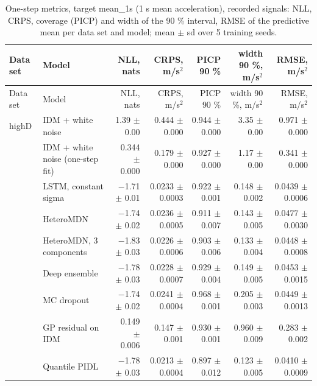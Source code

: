 \begingroup
\footnotesize
\begin{longtable}{llrrrrr}
\caption{One-step metrics, target mean\_1s (1 s mean acceleration), recorded signals: NLL, CRPS, coverage (PICP) and width of the 90 \% interval, RMSE of the predictive mean per data set and model; mean $\pm$ sd over 5 training seeds.}\label{tab:t1-one-step--raw--mean-1s} \\
\toprule
Data set & Model & NLL, nats & CRPS, m/s$^2$ & PICP 90 \% & width 90 \%, m/s$^2$ & RMSE, m/s$^2$ \\
\midrule
\endfirsthead
\toprule
Data set & Model & NLL, nats & CRPS, m/s$^2$ & PICP 90 \% & width 90 \%, m/s$^2$ & RMSE, m/s$^2$ \\
\midrule
\endhead
\bottomrule
\endlastfoot
highD & IDM + white noise & 1.39 $\pm$ 0.00 & 0.444 $\pm$ 0.000 & 0.944 $\pm$ 0.000 & 3.35 $\pm$ 0.00 & 0.971 $\pm$ 0.000 \\
 & IDM + white noise (one-step fit) & 0.344 $\pm$ 0.000 & 0.179 $\pm$ 0.000 & 0.927 $\pm$ 0.000 & 1.17 $\pm$ 0.00 & 0.341 $\pm$ 0.000 \\
 & LSTM, constant sigma & $-$1.71 $\pm$ 0.01 & 0.0233 $\pm$ 0.0003 & 0.922 $\pm$ 0.001 & 0.148 $\pm$ 0.002 & 0.0439 $\pm$ 0.0006 \\
 & HeteroMDN & $-$1.74 $\pm$ 0.02 & 0.0236 $\pm$ 0.0005 & 0.911 $\pm$ 0.007 & 0.143 $\pm$ 0.005 & 0.0477 $\pm$ 0.0030 \\
 & HeteroMDN, 3 components & $-$1.83 $\pm$ 0.03 & 0.0226 $\pm$ 0.0006 & 0.903 $\pm$ 0.006 & 0.133 $\pm$ 0.004 & 0.0448 $\pm$ 0.0008 \\
 & Deep ensemble & $-$1.78 $\pm$ 0.03 & 0.0228 $\pm$ 0.0007 & 0.929 $\pm$ 0.004 & 0.149 $\pm$ 0.005 & 0.0453 $\pm$ 0.0015 \\
 & MC dropout & $-$1.74 $\pm$ 0.02 & 0.0241 $\pm$ 0.0004 & 0.968 $\pm$ 0.001 & 0.205 $\pm$ 0.003 & 0.0449 $\pm$ 0.0013 \\
 & GP residual on IDM & 0.149 $\pm$ 0.006 & 0.147 $\pm$ 0.001 & 0.930 $\pm$ 0.001 & 0.960 $\pm$ 0.009 & 0.283 $\pm$ 0.002 \\
 & Quantile PIDL & $-$1.78 $\pm$ 0.03 & 0.0213 $\pm$ 0.0004 & 0.897 $\pm$ 0.012 & 0.123 $\pm$ 0.005 & 0.0410 $\pm$ 0.0009 \\

\end{longtable}

